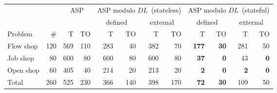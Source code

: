\documentclass{article}
\begin{document}
\newcommand{\TO}{\multicolumn{1}{r|}{TO}}
\newcommand{\TI}{\multicolumn{1}{r|}{T}}
\newcommand{\DL}{\ensuremath{\mathit{DL}}}

\begin{tabular}{|l|r||r|r|r|r|r|r|r|r|r|r|}
\cline{1-12}
&  & \multicolumn{2}{c|}{ASP} & \multicolumn{4}{c|}{ASP modulo \DL\ (stateless)}&  \multicolumn{4}{c|}{ASP modulo \DL\ (stateful)}\\
&  & \multicolumn{2}{c|}{} & \multicolumn{2}{c|}{defined} & \multicolumn{2}{c|}{external} & \multicolumn{2}{c|}{defined} & \multicolumn{2}{c|}{external}\\
\multicolumn{1}{|l|}{Problem} & \multicolumn{1}{r||}{\#} & \TI & \TO & \TI & \TO & \TI & \TO & \TI & \TO & \TI & \TO\\\hline
Flow shop & 120 & 569 & 110 & 283 & 40 & 382  & 70 & \textbf{177} & \textbf{30} & 281 & 50\\
Job shop & 80 & 600 & 80 & 600 & 80 & 600& 80 & \textbf{37} & \textbf{0} & 43 & \textbf{0}\\
Open shop & 60 & 405 & 40 & 214 & 20 & 213 & 20 & \textbf{2} & \textbf{0} &\textbf{2} & \textbf{0}\\\hline\hline
Total& 260 & 525 & 230 & 366 & 140 & 398 & 170 & \textbf{72} & \textbf{30} & 109  & 50 \\\hline
\end{tabular}
\end{document}

